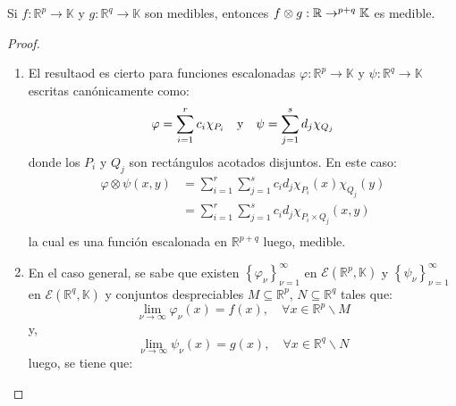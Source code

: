 \documentclass[12pt]{report}
\theoremstyle{largebreak}
\newcommand\cf[3]{\ensuremath{#1:#2\rightarrow#3}}
\begin{document}
    \begin{propo}
        Si $\cf{f}{\mathbb{R}^p}{\mathbb{K}}$ y $\cf{g}{\mathbb{R}^q}{\mathbb{K}}$ son medibles, entonces $\cf{f\otimes g}{\mathbb{R}}^{ p+q}{\mathbb{K}}$ es medible.
    \end{propo}

    \begin{proof}
        \begin{enumerate}
            \item El resultaod es cierto para funciones escalonadas $\cf{\varphi}{\mathbb{R}^p}{\mathbb{K}}$ y $\cf{\psi}{\mathbb{R}^q}{\mathbb{K}}$ escritas canónicamente como:
            \begin{equation*}
                \varphi=\sum_{ i=1}^{r}c_i\chi_{ P_i}\quad\textup{y}\quad\psi=\sum_{ j=1}^{s}d_j\chi_{ Q_j}
            \end{equation*}
            donde los $P_i$ y $Q_j$ son rectángulos acotados disjuntos. En este caso:
            \begin{equation*}
                \begin{split}
                    \varphi\otimes \psi(x,y)&=\sum_{ i=1}^{r}\sum_{ j=1}^{s}c_id_j\chi_{ P_i}(x)\chi_{ Q_j}(y)\\
                    &=\sum_{ i=1}^{r}\sum_{ j=1}^{s}c_id_j\chi_{ P_i\times Q_j}(x,y)\\
                \end{split}
            \end{equation*}
            la cual es una función escalonada en $\mathbb{R}^{ p+q}$ luego, medible.
            \item En el caso general, se sabe que existen $\left\{ \varphi_\nu\right\}_{ \nu=1}^\infty$ en $\mathcal{E}(\mathbb{R}^p,\mathbb{K})$ y $\left\{\psi_\nu \right\}_{ \nu=1}^\infty$ en $\mathcal{E}(\mathbb{R}^q,\mathbb{K})$ y conjuntos despreciables $M\subseteq \mathbb{R}^p$, $N\subseteq \mathbb{R}^q$ tales que:
            \begin{equation*}
                \lim_{ \nu\rightarrow\infty}\varphi_\nu(x)=f(x),\quad\forall x\in \mathbb{R}^p\backslash M
            \end{equation*}
            y,
            \begin{equation*}
                \lim_{ \nu\rightarrow\infty}\psi_\nu(x)=g(x),\quad\forall x\in \mathbb{R}^q\backslash N
            \end{equation*}
            luego, se tiene que:
            \begin{equation*}

\end{equation*}
\end{enumerate}
\end{proof}
\end{document}
